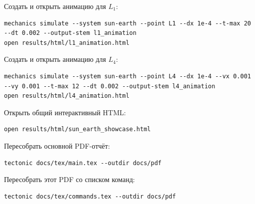 \documentclass[a4paper,12pt]{article}
\begin{document}
Создать и открыть анимацию для $L_1$:

\begin{lstlisting}
mechanics simulate --system sun-earth --point L1 --dx 1e-4 --t-max 20 --dt 0.002 --output-stem l1_animation
open results/html/l1_animation.html
\end{lstlisting}

Создать и открыть анимацию для $L_4$:

\begin{lstlisting}
mechanics simulate --system sun-earth --point L4 --dx 1e-4 --vx 0.001 --vy 0.001 --t-max 12 --dt 0.002 --output-stem l4_animation
open results/html/l4_animation.html
\end{lstlisting}

Открыть общий интерактивный HTML:

\begin{lstlisting}
open results/html/sun_earth_showcase.html
\end{lstlisting}

Пересобрать основной PDF-отчёт:

\begin{lstlisting}
tectonic docs/tex/main.tex --outdir docs/pdf
\end{lstlisting}

Пересобрать этот PDF со списком команд:

\begin{lstlisting}
tectonic docs/tex/commands.tex --outdir docs/pdf
\end{lstlisting}
\end{document}
